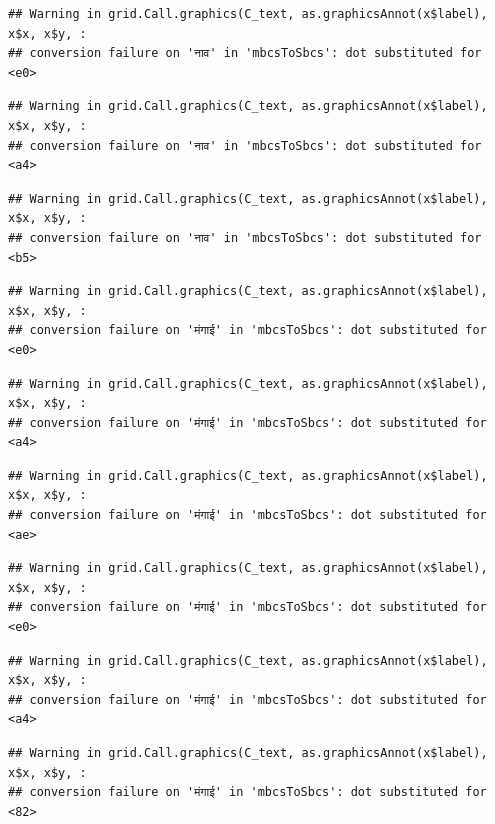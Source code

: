 \documentclass[
]{article}
\begin{document}
\begin{verbatim}
## Warning in grid.Call.graphics(C_text, as.graphicsAnnot(x$label), x$x, x$y, :
## conversion failure on 'नाव' in 'mbcsToSbcs': dot substituted for <e0>
\end{verbatim}

\begin{verbatim}
## Warning in grid.Call.graphics(C_text, as.graphicsAnnot(x$label), x$x, x$y, :
## conversion failure on 'नाव' in 'mbcsToSbcs': dot substituted for <a4>
\end{verbatim}

\begin{verbatim}
## Warning in grid.Call.graphics(C_text, as.graphicsAnnot(x$label), x$x, x$y, :
## conversion failure on 'नाव' in 'mbcsToSbcs': dot substituted for <b5>
\end{verbatim}

\begin{verbatim}
## Warning in grid.Call.graphics(C_text, as.graphicsAnnot(x$label), x$x, x$y, :
## conversion failure on 'मंगाई' in 'mbcsToSbcs': dot substituted for <e0>
\end{verbatim}

\begin{verbatim}
## Warning in grid.Call.graphics(C_text, as.graphicsAnnot(x$label), x$x, x$y, :
## conversion failure on 'मंगाई' in 'mbcsToSbcs': dot substituted for <a4>
\end{verbatim}

\begin{verbatim}
## Warning in grid.Call.graphics(C_text, as.graphicsAnnot(x$label), x$x, x$y, :
## conversion failure on 'मंगाई' in 'mbcsToSbcs': dot substituted for <ae>
\end{verbatim}

\begin{verbatim}
## Warning in grid.Call.graphics(C_text, as.graphicsAnnot(x$label), x$x, x$y, :
## conversion failure on 'मंगाई' in 'mbcsToSbcs': dot substituted for <e0>
\end{verbatim}

\begin{verbatim}
## Warning in grid.Call.graphics(C_text, as.graphicsAnnot(x$label), x$x, x$y, :
## conversion failure on 'मंगाई' in 'mbcsToSbcs': dot substituted for <a4>
\end{verbatim}

\begin{verbatim}
## Warning in grid.Call.graphics(C_text, as.graphicsAnnot(x$label), x$x, x$y, :
## conversion failure on 'मंगाई' in 'mbcsToSbcs': dot substituted for <82>
\end{verbatim}
\end{document}
